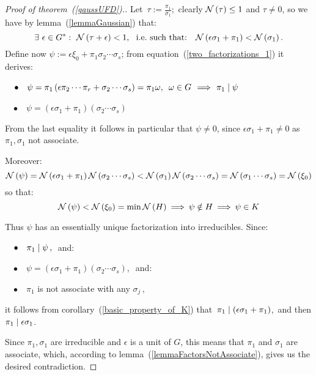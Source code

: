 \begin{proof}[Proof of theorem~(\ref{gaussUFD}).]

Let \,$\tau:= \frac{\pi_1}{\sigma_1}$;\, clearly
$\mathcal{N}\left(\tau\right) \leq 1$ and $\tau \neq 0$, so we have by
lemma~(\ref{lemmaGaussian}) that:
%
\begin{equation*}
\exists\ \epsilon \in G^\ast :\ \mathcal{N}\left(\tau + \epsilon\right) < 1,
\quad\!\! \textrm{\text{i.e.\ }such that:} \quad
\mathcal{N}\left(\epsilon\sigma_1 + \pi_1\right) < \mathcal{N}\left(\sigma_1\right).
\end{equation*}
%
Define now
$\psi:= \epsilon \xi_0 + \pi_1 \sigma_2 \cdots \sigma_s$;
from equation~(\ref{two_factorizations_1}) it derives:

~~$\bullet\quad \psi = \pi_1 \left( \epsilon\pi_2\cdots\pi_r +
\sigma_2\cdots\sigma_s \right) = \pi_1\omega,
\ \,\omega \in G\, \:\Longrightarrow\:\, \pi_1 \mid \psi$

~~$\bullet\quad \psi = \left( \epsilon\sigma_1 + \pi_1 \right)
\left( \sigma_2\cdots\sigma_s  \right)$

From the last equality it follows in particular that
$\psi \not= 0$, since $\epsilon \sigma_1 + \pi_1 \neq 0$
as $\pi_1, \sigma_1$ not associate.

Moreover:
\begin{equation*}
\mathcal{N}\left(\psi\right) =
   \mathcal{N}\left(\epsilon\sigma_1 + \pi_1\right)
   \mathcal{N}\left(\sigma_2\cdots\sigma_s\right) 
< \mathcal{N}\left(\sigma_1\right)\mathcal{N}\left(\sigma_2\cdots\sigma_s\right)
= \mathcal{N}\left(\sigma_1\cdots\sigma_s\right) = \mathcal{N}\left(\xi_0\right)
\end{equation*}
so that:
\begin{equation*}
\mathcal{N}\left(\psi\right) < \mathcal{N}\left(\xi_0\right) = \min{\mathcal{N}\left(H\right)} \:\Longrightarrow\:
\psi \notin H \:\Longrightarrow\: \psi \in K 
\end{equation*}

Thus $\psi$ has an essentially unique factorization into
irreducibles. Since:

~~$\bullet\quad \pi_1 \mid \psi\,,\;$ and:

~~$\bullet\quad \psi = \left( \epsilon\sigma_1 + \pi_1 \right)
\left( \sigma_2\cdots\sigma_s  \right),\:$ and:

~~$\bullet\quad \pi_1$ is not associate with any $\sigma_j\,,$

it follows from corollary~(\ref{basic_property_of_K}) that\,
$\pi_1 \mid \left( \epsilon\sigma_1 + \pi_1 \right)$,\,
and then\, $\pi_1 \mid \epsilon\sigma_1$.

Since $\pi_1,\sigma_1$ are irreducible and $\epsilon$ is a
unit of $G$, this means that $\pi_1$ and $\sigma_1$ are
associate, which, according to
lemma~(\ref{lemmaFactorsNotAssociate}),
gives us the desired contradiction.
%
\end{proof}


